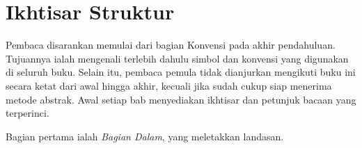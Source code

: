 
\section*{Ikhtisar Struktur}
\hypertarget{o014.aljabr2.prelude.structure-overview}{ }

Pembaca disarankan memulai dari bagian Konvensi pada akhir pendahuluan.
Tujuannya ialah mengenali terlebih dahulu simbol dan konvensi yang
digunakan di seluruh buku. Selain itu, pembaca pemula tidak dianjurkan
mengikuti buku ini secara ketat dari awal hingga akhir, kecuali jika sudah
cukup siap menerima metode abstrak. Awal setiap bab menyediakan ikhtisar
dan petunjuk bacaan yang terperinci.

Bagian pertama ialah \emph{Bagian Dalam}, yang meletakkan landasan.

